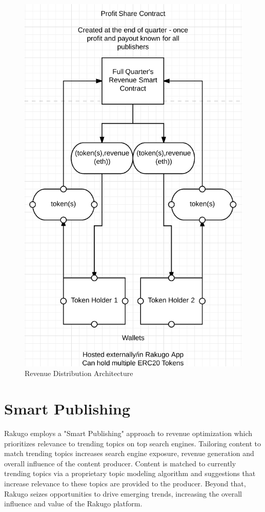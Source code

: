 \documentclass{article}
\begin{document}
\begin{figure}[H]
\centering
\includegraphics[scale=0.65]{revenue_dispersal.png}
\caption{Revenue Distribution Architecture}
\end{figure}

\section{Smart Publishing}
Rakugo employs a "Smart Publishing" approach to revenue optimization which prioritizes relevance to trending topics on top search engines. Tailoring content to match trending topics increases search engine exposure, revenue generation and overall influence of the content producer. Content is matched to currently trending topics via a proprietary topic modeling algorithm and suggestions that increase relevance to these topics are provided to the producer. Beyond that, Rakugo seizes opportunities to drive emerging trends, increasing the overall influence and value of the Rakugo platform. 
\end{document}
